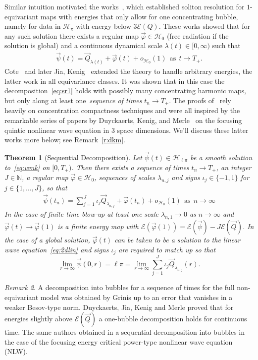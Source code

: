 \documentclass[10pt,reqno]{amsart}
\newcommand{\E}{\mathcal{E}}
\newcommand{\HH}{\mathcal{H}}
\newcommand{\N}{\mathbb{N}}
\newcommand{\fy}{\varphi}
\newcommand{\la}{\lambda}
\newcommand{\EQ}[1]{\begin{equation}\begin{split} #1 \end{split}\end{equation}}
\numberwithin{equation}{section}
\newtheorem{thm}{Theorem}[section]
\theoremstyle{remark}
\newtheorem{rem}[thm]{Remark}
\newcommand{\mas}{{\ \ \text{as} \ \ }}
\newcommand{\0}{\emptyset}
\begin{document}
Similar intuition motivated the works~\cite{CKLS1, CKLS2}, which established soliton resolution for $1$-equivariant maps with energies that only allow for one concentrating bubble, namely for data in $\HH_{\pi}$ with energy below $3\E(Q)$. These works showed that for any such solution there exists a regular map $\vec \fy \in \HH_0$ (free radiation if the solution is global) and a continuous dynamical scale  $\la(t)   \in [0, \infty)$ such that 
\EQ{ \label{eq:sr1} 
 \vec \psi(t) = \vec Q_{\la(t)}  +  \vec \fy(t) + o_{\HH_0}(1) \mas t \to T_+. 
} 
 Cote~\cite{Cote15} and later Jia, Kenig~\cite{JK} extended the theory to handle arbitrary energies, the latter work in all equivariance classes. %
It was shown that in  this case the decomposition~\eqref{eq:sr1} holds with possibly many concentrating harmonic maps, but only along at least one~\emph{sequence of times}  $t_n \to T_+$. 
The proofs of~\cite{CKLS1, CKLS2, Cote15, JK} rely heavily on concentration compactness techniques and were all inspired by the remarkable series of papers by Duyckaerts, Kenig, and Merle~\cite{DKM1, DKM2, DKM3, DKM4} on the focusing quintic nonlinear wave equation in $3$ space dimensions. We'll discuss these latter works more below; see Remark~\ref{r:dkm}. 

\begin{thm}[Sequential Decomposition]\emph{ \cite{Cote15, JK}}\label{t:cjk} Let $\vec \psi(t)\in \HH_{\ell \pi}$ be a smooth solution to~\eqref{eq:wmk} on $[0, T_+)$. Then there exists a sequence of times $t_n \to T_+$, an integer $J \in \N$, a regular map $\vec \fy \in \HH_0$, sequences of scales $\la_{n, j}$ and signs $\iota_j \in \{-1, 1\}$ for $j \in \{1,  \dots, J\}$,  so that 
\EQ{ \label{eq:seq} 
 \vec \psi(t_n)  = \sum_{j =1}^J \iota_j \vec Q_{\la_{n,j}}  + \vec \fy(t_n) + o_{\HH_0}(1) \mas n \to \infty
}
In the case of finite time blow-up at least one scale $\la_{n, 1} \to 0$ as $n \to \infty$ and $\vec \fy(t) \to \vec \fy(1)$ is a finite energy  map  with $\E(\vec \fy(1)) = \E(\vec \psi) - J\E(\vec Q)$. In the case of a global solution,  $\vec \fy(t)$ can be taken to be a solution to the linear wave equation~\eqref{eq:2dlin} and 
 signs $\iota_j$ are required to match up so that $$\lim_{r \to \infty} \vec \psi(0, r) = \ell \pi  =  \lim_{r \to \infty} \sum_{j =1}^J \iota_j \vec Q_{\la_{n,j}}(r).$$ 
\end{thm}  
\begin{rem}
A decomposition into bubbles for a sequence of times for the full non-equivariant model was obtained by Grinis \cite{Gri} up to an error that vanishes in a weaker Besov-type norm. 
Duyckaerts, Jia, Kenig and Merle \cite{DJKM16} proved that for energies slightly above
$\E(\vec Q)$ a one-bubble decomposition holds for continuous time.
The same authors obtained in \cite{DJKM1} a sequential decomposition into bubbles
in the case of the focusing energy critical power-type nonlinear wave equation (NLW).  
\end{rem}
\end{document}
